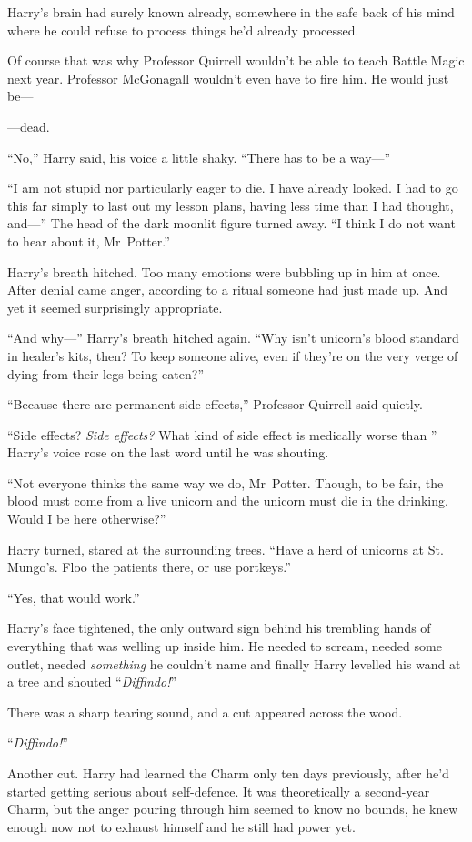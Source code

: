 Harry’s brain had surely known already, somewhere in the safe back of his mind where he could refuse to process things he’d already processed.

Of course that was why Professor Quirrell wouldn’t be able to teach Battle Magic next year. Professor McGonagall wouldn’t even have to fire him. He would just be—

—dead.

“No,” Harry said, his voice a little shaky. “There has to be a way—”

“I am not stupid nor particularly eager to die. I have already looked. I had to go this far simply to last out my lesson plans, having less time than I had thought, and—” The head of the dark moonlit figure turned away. “I think I do not want to hear about it, Mr~Potter.”

Harry’s breath hitched. Too many emotions were bubbling up in him at once. After denial came anger, according to a ritual someone had just made up. And yet it seemed surprisingly appropriate.

“And why—” Harry’s breath hitched again. “Why isn’t unicorn’s blood standard in healer’s kits, then? To keep someone alive, even if they’re on the very verge of dying from their legs being eaten?”

“Because there are permanent side effects,” Professor Quirrell said quietly.

“Side effects? \emph{Side effects?} What kind of side effect is medically worse than ” Harry’s voice rose on the last word until he was shouting.

“Not everyone thinks the same way we do, Mr~Potter. Though, to be fair, the blood must come from a live unicorn and the unicorn must die in the drinking. Would I be here otherwise?”

Harry turned, stared at the surrounding trees. “Have a herd of unicorns at St. Mungo’s. Floo the patients there, or use portkeys.”

“Yes, that would work.”

Harry’s face tightened, the only outward sign behind his trembling hands of everything that was welling up inside him. He needed to scream, needed some outlet, needed \emph{something} he couldn’t name and finally Harry levelled his wand at a tree and shouted “\emph{Diffindo!}”

There was a sharp tearing sound, and a cut appeared across the wood.

“\emph{Diffindo!}”

Another cut. Harry had learned the Charm only ten days previously, after he’d started getting serious about self-defence. It was theoretically a second-year Charm, but the anger pouring through him seemed to know no bounds, he knew enough now not to exhaust himself and he still had power yet.


